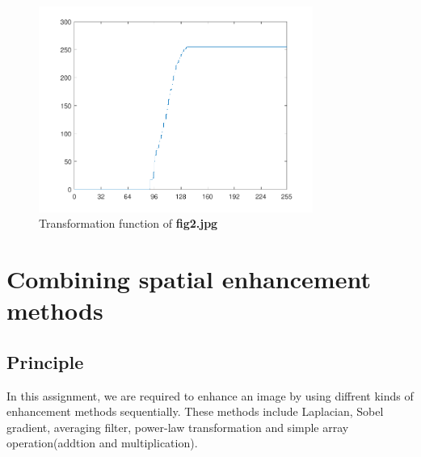 \documentclass[11pt,a4paper]{article}
\begin{document}
\begin{figure}[!htbp]
	\centering
	\includegraphics[width=0.8\textwidth]{pro1/fig2_trans}
	\caption{Transformation function of \textbf{fig2.jpg}}
	\label{pro1_fig4}
\end{figure}

\section{Combining spatial enhancement methods}
\subsection{Principle}
In this assignment, we are required to enhance an image by using diffrent kinds of enhancement methods
sequentially. These methods include Laplacian, Sobel gradient, averaging filter, power-law
 transformation and simple array operation(addtion and multiplication). 
\end{document}
